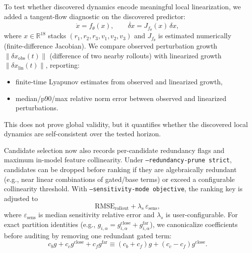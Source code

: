 \documentclass[11pt]{article}
\begin{document}
To test whether discovered dynamics encode meaningful local linearization, we added a tangent-flow diagnostic on the discovered predictor:
\begin{equation*}
\dot{x}=f_\theta(x),\qquad
\dot{\delta x}=J_{f_\theta}(x)\,\delta x,
\end{equation*}
where $x\in\mathbb{R}^{18}$ stacks $(r_1,r_2,r_3,v_1,v_2,v_3)$ and $J_{f_\theta}$ is estimated numerically (finite-difference Jacobian). We compare observed perturbation growth $\|\delta x_{\mathrm{obs}}(t)\|$ (difference of two nearby rollouts) with linearized growth $\|\delta x_{\mathrm{lin}}(t)\|$, reporting:
\begin{itemize}
\item finite-time Lyapunov estimates from observed and linearized growth,
\item median/p90/max relative norm error between observed and linearized perturbations.
\end{itemize}
This does not prove global validity, but it quantifies whether the discovered local dynamics are self-consistent over the tested horizon.

Candidate selection now also records per-candidate redundancy flags and maximum in-model feature collinearity. Under \texttt{--redundancy-prune strict}, candidates can be dropped before ranking if they are algebraically redundant (e.g., near linear combinations of gated/base terms) or exceed a configurable collinearity threshold. With \texttt{--sensitivity-mode objective}, the ranking key is adjusted to
\begin{equation*}
\mathrm{RMSE}_{\mathrm{rollout}}+\lambda_s\,\varepsilon_{\mathrm{sens}},
\end{equation*}
where $\varepsilon_{\mathrm{sens}}$ is median sensitivity relative error and $\lambda_s$ is user-configurable.
For exact partition identities (e.g., $g_{i,\alpha}=g^{\mathrm{close}}_{i,\alpha}+g^{\mathrm{far}}_{i,\alpha}$), we canonicalize coefficients before auditing by removing one redundant gated term:
\begin{equation*}
c_b g + c_c g^{\mathrm{close}} + c_f g^{\mathrm{far}}
\equiv (c_b+c_f)g + (c_c-c_f)g^{\mathrm{close}}.
\end{equation*}
\end{document}
